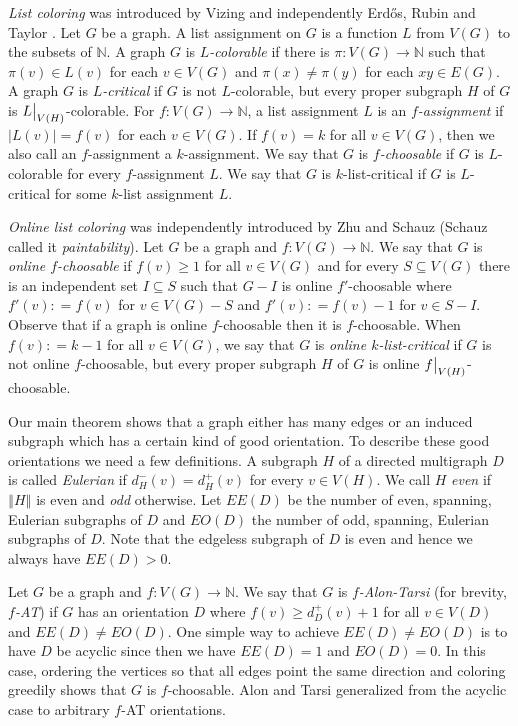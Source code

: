 \documentclass[12pt]{article}
\theoremstyle{plain}
\theoremstyle{definition}
\theoremstyle{remark}
\newcommand{\IN}{\mathbb{N}}
\newcommand{\card}[1]{\left|#1\right|}
\newcommand{\size}[1]{\left\Vert#1\right\Vert}
\newcommand{\func}[3]{#1\colon #2 \rightarrow #3}
\newcommand{\DefinedAs}{\mathrel{\mathop:}=}
\newcommand\restr[2]{{%
  \left.\kern-\nulldelimiterspace %
  #1 %
  \vphantom{\big|} %
  \right|_{#2} %
  }}
\begin{document}
\emph{List coloring} was introduced by Vizing \cite{vizing1976} and independently Erd\H{o}s, Rubin and Taylor \cite{erdos1979choosability}.  Let $G$ be a graph. A list assignment on $G$ is a function $L$ from $V(G)$ to the subsets of $\IN$.   A graph $G$ is \emph{$L$-colorable} if there is $\func{\pi}{V(G)}{\IN}$ such that $\pi(v) \in L(v)$ for each $v \in V(G)$ and $\pi(x) \ne \pi(y)$ for each $xy \in E(G)$.   A graph $G$ is \emph{$L$-critical} if $G$ is not $L$-colorable, but every proper subgraph $H$ of $G$ is $\restr{L}{V(H)}$-colorable. For $\func{f}{V(G)}{\IN}$, a list assignment $L$ is an \emph{$f$-assignment} if $\card{L(v)} = f(v)$ for each $v \in V(G)$.  If $f(v) = k$ for all $v \in V(G)$, then we also call an $f$-assignment a $k$-assignment.  We say that $G$ is \emph{$f$-choosable} if $G$ is $L$-colorable for every $f$-assignment $L$.  
We say that $G$ is $k$-list-critical if $G$ is $L$-critical for some $k$-list assignment $L$.

\emph{Online list coloring} was independently introduced by Zhu \cite{zhu2009online} and Schauz \cite{schauz2009mr} (Schauz called it \emph{paintability}). Let $G$ be a graph and $\func{f}{V(G)}{\IN}$.  We say that $G$ is \emph{online $f$-choosable} if $f(v) \ge 1$ for all $v \in V(G)$ and for every $S \subseteq V(G)$ there is an independent set $I \subseteq S$ such that $G-I$ is online $f'$-choosable where $f'(v) \DefinedAs f(v)$ for $v \in V(G) - S$ and $f'(v) \DefinedAs f(v) - 1$ for $v \in S - I$.
Observe that if a graph is online $f$-choosable then it is $f$-choosable. 
When $f(v) \DefinedAs k-1$ for all $v \in V(G)$, we say that $G$ is \emph{online $k$-list-critical} if $G$ is not online $f$-choosable, 
but every proper subgraph $H$ of $G$ is online $\restr{f}{V(H)}$-choosable.  

Our main theorem shows that a graph either has many edges or an induced subgraph which has a certain kind of good orientation.  To describe these good orientations we need a few definitions. A subgraph $H$ of a directed multigraph $D$ is called \emph{Eulerian} if $d^-_H(v) = d^+_H(v)$ for every $v \in V(H)$.  We call $H$ \emph{even} if $\size{H}$ is even and \emph{odd} otherwise.  Let $EE(D)$ be the number of even, spanning, Eulerian subgraphs of $D$ and $EO(D)$ the number of odd, spanning, Eulerian subgraphs of $D$.  Note that the edgeless subgraph of $D$ is even and hence we always have $EE(D) > 0$.

Let $G$ be a graph and $\func{f}{V(G)}{\IN}$.  We say that $G$ is \emph{$f$-Alon-Tarsi} (for brevity, \emph{$f$-AT}) if $G$ has an orientation $D$ where $f(v) \ge d_{D}^+(v) + 1$ for all $v \in V(D)$ and $EE(D) \ne EO(D)$. One simple way to achieve $EE(D) \ne EO(D)$ is to have $D$ be acyclic since then we have $EE(D) = 1$ and $EO(D) = 0$.  In this case, ordering the vertices so that all edges point the same direction and coloring greedily shows that $G$ is $f$-choosable. Alon and Tarsi \cite{Alon1992125} generalized from the acyclic case to arbitrary $f$-AT orientations.
\end{document}
